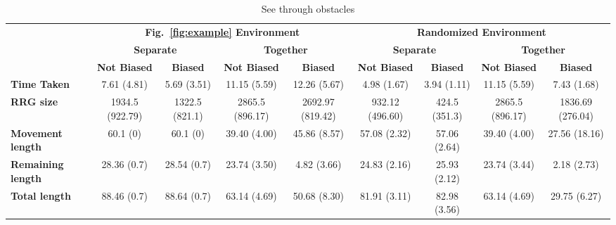 \begin{table*}[]
    \centering
    \caption{See through obstacles}
    \label{tab:my_label}
    \setlength{\tabcolsep}{3pt}
    \scriptsize
    \begin{tabular}{l c c c c c c c c }
        \toprule
        \textbf{} & \multicolumn{4}{c}{\textbf{Fig.~\ref{fig:example} Environment}} & \multicolumn{4}{c}{\textbf{Randomized Environment}} \\
        \cmidrule(lr{.75em}){2-5} \cmidrule(l{.75em}r){6-9}
		\textbf{} & \multicolumn{2}{c}{\textbf{Separate}} & \multicolumn{2}{c}{\textbf{Together}} &
		            \multicolumn{2}{c}{\textbf{Separate}} & \multicolumn{2}{c}{\textbf{Together}}\\
		\cmidrule(lr{.75em}){2-3} \cmidrule(l{.75em}r){4-5} \cmidrule(lr{.75em}){6-7} \cmidrule(l{.75em}r){8-9}
		\textbf{} & \textbf{Not Biased} & \textbf{Biased} & \textbf{Not Biased} & \textbf{Biased} & 
		            \textbf{Not Biased} & \textbf{Biased} & \textbf{Not Biased} & \textbf{Biased}\\
		\textbf{Time Taken}       & 7.61 (4.81) & 5.69 (3.51) & 11.15 (5.59) & 12.26 (5.67) & 
		                            4.98 (1.67) & 3.94 (1.11) & 11.15 (5.59) & 7.43 (1.68)\\
		\textbf{RRG size}         & 1934.5 (922.79) & 1322.5 (821.1)  & 2865.5 (896.17) & 2692.97 (819.42)&
		                            932.12 (496.60) & 424.5 (351.3) & 2865.5 (896.17) & 1836.69 (276.04) \\
		\textbf{Movement length}  & 60.1 (0)    & 60.1 (0)    & 39.40 (4.00) & 45.86 (8.57) & 
		                            57.08 (2.32) & 57.06 (2.64) & 39.40 (4.00) & 27.56 (18.16) \\
		\textbf{Remaining length} & 28.36 (0.7) & 28.54 (0.7) & 23.74 (3.50) & 4.82 (3.66) & 
		                            24.83 (2.16) & 25.93 (2.12) & 23.74 (3.44) & 2.18 (2.73)\\
		\textbf{Total length}     & 88.46 (0.7) & 88.64 (0.7) & 63.14 (4.69) & 50.68 (8.30) & 
		                            81.91 (3.11) & 82.98 (3.56) & 63.14 (4.69) & 29.75 (6.27)\\
		\bottomrule
    \end{tabular}
\end{table*}

